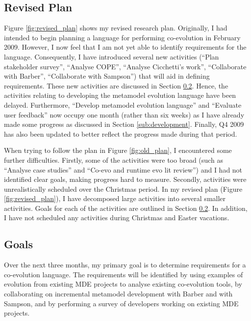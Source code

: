 \subsection{Revised Plan}
\label{sub:revised_plan}
Figure \ref{fig:revised_plan} shows my revised research plan. Originally, I had intended to begin planning a language for performing co-evolution in February 2009. However, I now feel that I am not yet able to identify requirements for the language. Consequently, I have introduced several new activities (``Plan stakeholder survey'', ``Analyse COPE'', ``Analyse Cicchetti's work'', ``Collaborate with Barber'', ``Collaborate with Sampson'') that will aid in defining requirements. These new activities are discussed in Section \ref{sub:goals}. Hence, the activities relating to developing the metamodel evolution language have been delayed. Furthermore, ``Develop metamodel evolution language'' and ``Evaluate user feedback'' now occupy one month (rather than six weeks) as I have already made some progress as discussed in Section \ref{sub:development}. Finally, Q4 2009 has also been updated to better reflect the progress made during that period.


When trying to follow the plan in Figure \ref{fig:old_plan}, I encountered some further difficulties. Firstly, some of the activities were too broad (such as ``Analyse case studies'' and ``Co-evo and runtime evo lit review'') and I had not identified clear goals, making progress hard to measure. Secondly, activities were unrealistically scheduled over the Christmas period.  In my revised plan (Figure \ref{fig:revised_plan}), I have decomposed large activities into several smaller activities. Goals for each of the activities are outlined in Section \ref{sub:goals}. In addition, I have not scheduled any activities during Christmas and Easter vacations.

\clearpage
\setlength\paperheight{297mm}
\setlength\paperwidth{420mm}
\setlength\pdfpageheight{\paperheight}
\setlength\pdfpagewidth{\paperwidth}



\setlength\paperheight{297mm}
\setlength\paperwidth{210mm}
\setlength\pdfpageheight{\paperheight}
\setlength\pdfpagewidth{\paperwidth}

\subsection{Goals} %
\label{sub:goals}
Over the next three months, my primary goal is to determine requirements for a co-evolution language. The requirements will be identified by using examples of evolution from existing MDE projects to analyse existing co-evolution tools, by collaborating on incremental metamodel development with Barber and with Sampson, and by performing a survey of developers working on existing MDE projects.

